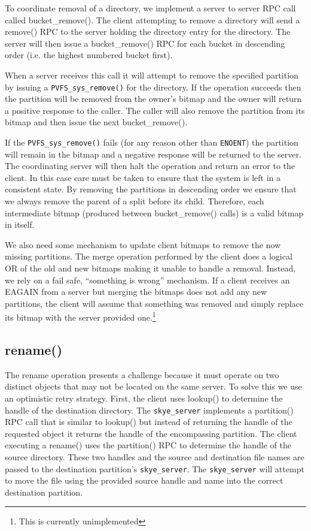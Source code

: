 \documentclass[letterpaper]{article}
\newcommand{\code}[1]{\texttt{#1}}
\begin{document}
To coordinate removal of a directory, we implement a server to server RPC call
called bucket\_\-remove().  The client attempting to remove a directory will send a
remove() RPC to the server holding the directory entry for the directory.  The
server will then issue a bucket\_\-remove() RPC for each bucket in descending order
(i.e. the highest numbered bucket first).  

When a server receives this call it will attempt to remove the specified
partition by issuing a \code{PVFS\_\-sys\_\-remove()} for the directory.  If the operation
succeeds then the partition will be removed from the owner's bitmap and the
owner will return a positive response to the caller.  The caller will also
remove the partition from its bitmap and then issue the next bucket\_\-remove().

If the \code{PVFS\_\-sys\_\-remove()} fails (for any reason other than \code{ENOENT}) the partition
will remain in the bitmap and a negative response will be returned to the
server.  The coordinating server will then halt the operation and return an
error to the client.  In this case care must be taken to ensure that the system
is left in a consistent state.  By removing the partitions in descending order
we ensure that we always remove the parent of a split before its child.
Therefore, each intermediate bitmap (produced between bucket\_\-remove() calls) is
a valid bitmap in itself.

We also need some mechanism to update client bitmaps to remove the now missing
partitions.  The merge operation performed by the client does a logical
OR of the old and new bitmaps making it unable to handle a removal.  Instead, we
rely on a fail safe, ``something is wrong'' mechanism.  If a client receives an
EAGAIN from a server but merging the bitmaps does not add any new partitions,
the client will assume that something was removed and simply replace its bitmap
with the server provided one.\footnote{This is currently unimplemented}

\subsection{rename()}
The rename operation presents a challenge because it must operate on two distinct
objects that may not be located on the same server.  To solve this we use an
optimistic retry strategy.  First, the client uses lookup() to determine the
handle of the destination directory.  The \code{skye\_\-server} implements a partition()
RPC call that is similar to lookup() but instead of returning the handle of the
requested object it returns the handle of the encompassing partition.  The
client executing a rename() uses the partition() RPC to determine the handle of
the source directory.  These two handles and the source and destination file
names are passed to the destination partition's \code{skye\_\-server}.  The \code{skye\_\-server}
will attempt to move the file using the provided source handle and name into the
correct destination partition.  
\end{document}
